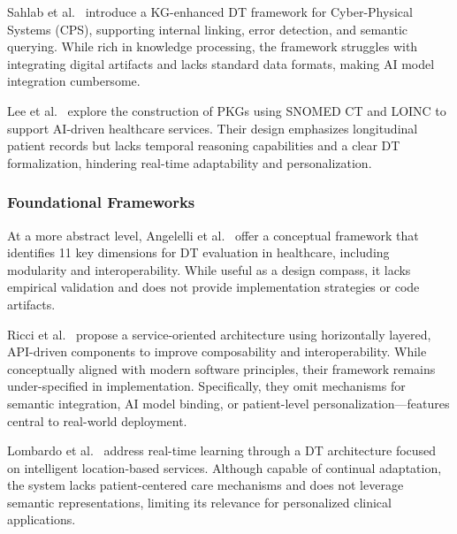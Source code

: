 Sahlab et al.~\cite{sahlab_knowledge_2021} introduce a KG-enhanced DT framework for Cyber-Physical Systems (CPS), supporting internal linking, error detection, and semantic querying. While rich in knowledge processing, the framework struggles with integrating digital artifacts and lacks standard data formats, making AI model integration cumbersome.

Lee et al.~\cite{lee_digital_2025} explore the construction of PKGs using SNOMED CT and LOINC to support AI-driven healthcare services. Their design emphasizes longitudinal patient records but lacks temporal reasoning capabilities and a clear DT formalization, hindering real-time adaptability and personalization.
%
\subsubsection{Foundational Frameworks}
At a more abstract level, Angelelli et al.~\cite{pellegrino_conceptual_2025} offer a conceptual framework that identifies 11 key dimensions for DT evaluation in healthcare, including modularity and interoperability. While useful as a design compass, it lacks empirical validation and does not provide implementation strategies or code artifacts.

Ricci et al.~\cite{9325551_ricci} propose a service-oriented architecture using horizontally layered, API-driven components to improve composability and interoperability. While conceptually aligned with modern software principles, their framework remains under-specified in implementation. Specifically, they omit mechanisms for semantic integration, AI model binding, or patient-level personalization—features central to real-world deployment.

Lombardo et al.~\cite{LOMBARDO2024107203} address real-time learning through a DT architecture focused on intelligent location-based services. Although capable of continual adaptation, the system lacks patient-centered care mechanisms and does not leverage semantic representations, limiting its relevance for personalized clinical applications.

